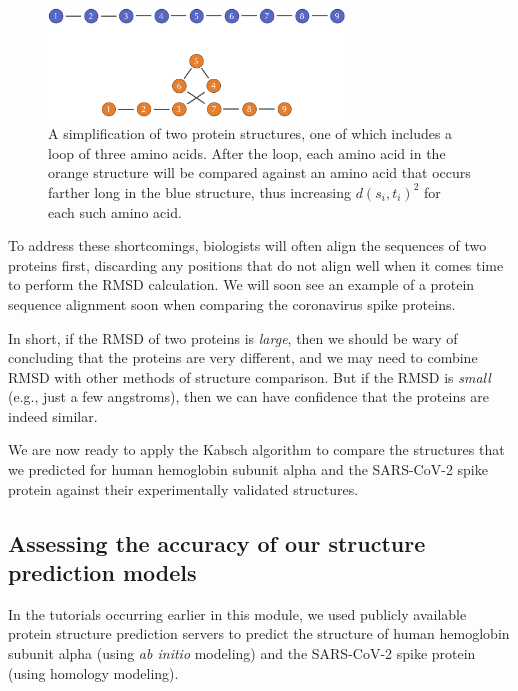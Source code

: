 {{\begin{figure}[h]
	\centering
	\mySfFamily
	\includegraphics[width = 0.7\textwidth]{../images/RMSD_weakness_loop.png}
	\caption{A simplification of two protein structures, one of which includes a loop of three amino acids. After the loop, each amino acid in the orange structure will be compared against an amino acid that occurs farther long in the blue structure, thus increasing $d(s_{i}, t_{i})^2$ for each such amino acid.}
	\label{fig:RMSD_weakness_loop}
\end{figure}

To address these shortcomings, biologists will often align the sequences of two proteins first, discarding any positions that do not align well when it comes time to perform the RMSD calculation. We will soon see an example of a protein sequence alignment soon when comparing the coronavirus spike proteins.

In short, if the RMSD of two proteins is \textit{large}, then we should be wary of concluding that the proteins are very different, and we may need to combine RMSD with other methods of structure comparison. But if the RMSD is \textit{small} (e.g., just a few angstroms), then we can have confidence that the proteins are indeed similar.

We are now ready to apply the Kabsch algorithm to compare the structures that we predicted for human hemoglobin subunit alpha and the SARS-CoV-2 spike protein against their experimentally validated structures. 

\FloatBarrier
{}
\subsection{Assessing the accuracy of our structure prediction models}

In the tutorials occurring earlier in this module, we used publicly available protein structure prediction servers to predict the structure of human hemoglobin subunit alpha (using \textit{ab initio} modeling) and the SARS-CoV-2 spike protein (using homology modeling).

}}
